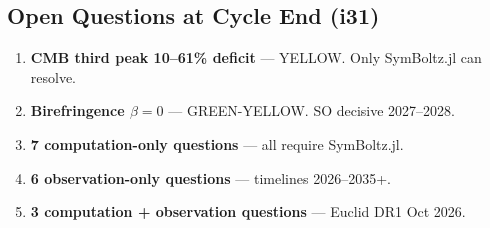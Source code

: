 \documentclass[11pt,a4paper]{article}
\begin{document}
\subsection{Open Questions at Cycle End (i31)}

\begin{enumerate}
  \item \textbf{CMB third peak 10--61\% deficit} --- YELLOW. Only
    SymBoltz.jl can resolve.
  \item \textbf{Birefringence $\beta = 0$} --- GREEN-YELLOW. SO decisive
    2027--2028.
  \item \textbf{7 computation-only questions} --- all require SymBoltz.jl.
  \item \textbf{6 observation-only questions} --- timelines 2026--2035+.
  \item \textbf{3 computation + observation questions} --- Euclid DR1
    Oct 2026.
\end{enumerate}
\end{document}
